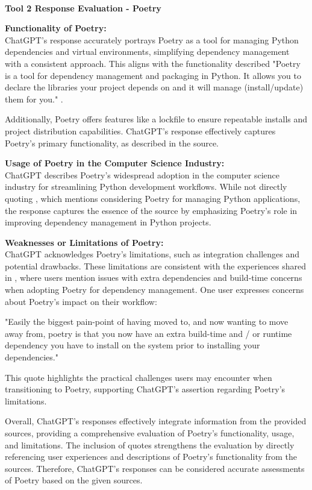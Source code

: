\documentclass[a4paper, 11pt]{report}
\begin{document}
\vspace{\baselineskip}\\
\noindent \textbf{\large{Tool 2 Response Evaluation - Poetry}}

\textbf{Functionality of Poetry:} \\
\noindent ChatGPT's response accurately portrays Poetry as a tool for managing Python dependencies and virtual environments, simplifying dependency management with a consistent approach. This aligns with the functionality described "Poetry is a tool for dependency management and packaging in Python. It allows you to declare the libraries your project depends on and it will manage (install/update) them for you."  \cite{poetryoverview}.

Additionally, Poetry offers features like a lockfile to ensure repeatable installs and project distribution capabilities. ChatGPT's response effectively captures Poetry's primary functionality, as described in the source. 

\textbf{Usage of Poetry in the Computer Science Industry:} \\
\noindent ChatGPT describes Poetry's widespread adoption in the computer science industry for streamlining Python development workflows. While not directly quoting \cite{poetrylimits}, which mentions considering Poetry for managing Python applications, the response captures the essence of the source by emphasizing Poetry's role in improving dependency management in Python projects. 

\textbf{Weaknesses or Limitations of Poetry:} \\
\noindent ChatGPT acknowledges Poetry's limitations, such as integration challenges and potential drawbacks. These limitations are consistent with the experiences shared in \cite{poetrylimits}, where users mention issues with extra dependencies and build-time concerns when adopting Poetry for dependency management. One user expresses concerns about Poetry's impact on their workflow: 

"Easily the biggest pain-point of having moved to, and now wanting to move away from, poetry is that you now have an extra build-time and / or runtime dependency you have to install on the system prior to installing your dependencies." 

This quote highlights the practical challenges users may encounter when transitioning to Poetry, supporting ChatGPT's assertion regarding Poetry's limitations. 

Overall, ChatGPT's responses effectively integrate information from the provided sources, providing a comprehensive evaluation of Poetry's functionality, usage, and limitations. The inclusion of quotes strengthens the evaluation by directly referencing user experiences and descriptions of Poetry's functionality from the sources. Therefore, ChatGPT's responses can be considered accurate assessments of Poetry based on the given sources. 
\end{document}
